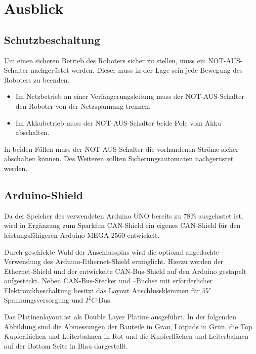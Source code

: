 
\section{Ausblick}
\label{sec:Ausblick}

\subsection{Schutzbeschaltung}
\label{sec:Schutzbeschaltung}
Um einen sicheren Betrieb des Roboters sicher zu stellen, muss ein NOT-AUS-Schalter nachgerüstet werden. Dieser muss in der Lage sein jede Bewegung des Roboters zu beenden.
\begin{itemize}
\item{Im Netzbetrieb an einer Verlängerungsleitung muss der NOT-AUS-Schalter den Roboter von der Netzspannung trennen.}
\item{Im Akkubetrieb muss der NOT-AUS-Schalter beide Pole vom Akku abschalten.}
\end{itemize}
In beiden Fällen muss der NOT-AUS-Schalter die vorhandenen Ströme sicher abschalten können. Des Weiteren sollten Sicherungsautomaten nachgerüstet werden. 

\subsection{Arduino-Shield}
\label{sec:Arduino-Shield}
Da der Speicher des verwendeten Arduino UNO bereits zu $78\%$ ausgelastet ist, wird in Ergänzung zum Sparkfun CAN-Shield ein eigenes CAN-Shield für den leistungsfähigeren Arduino MEGA 2560 entwickelt.
 
Durch geschickte Wahl der Anschlusspins wird die optional angedachte Verwendung des Arduino-Ethernet-Shield ermöglicht. Hierzu werden der Ethernet-Shield und der entwickelte CAN-Bus-Shield auf den Arduino gestapelt aufgesteckt. Neben CAN-Bus-Stecker und –Buchse mit erforderlicher Elektronikbeschaltung besitzt das Layout Anschlussklemmen für $5V$ Spannungsversorgung und $I^{2}C$-Bus.

Das Platinenlayout ist als Double Layer Platine ausgeführt. In der folgenden Abbildung
sind die Abmessungen der Bauteile  in Grau, Lötpads in Grün, die Top Kupferflächen und Leiterbahnen in Rot und die Kupferflächen  und Leiterbahnen auf der Bottom Seite in Blau dargestellt.

